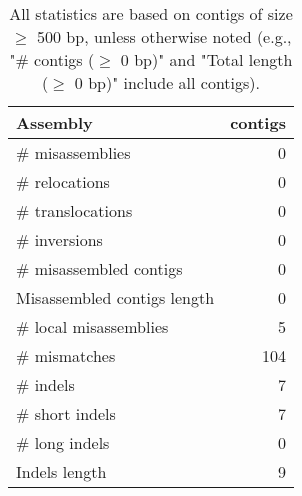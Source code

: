 \documentclass[12pt,a4paper]{article}
\begin{document}
\begin{table}[ht]
\begin{center}
\caption{All statistics are based on contigs of size $\geq$ 500 bp, unless otherwise noted (e.g., "\# contigs ($\geq$ 0 bp)" and "Total length ($\geq$ 0 bp)" include all contigs).}
\begin{tabular}{|l*{1}{|r}|}
\hline
Assembly & contigs \\ \hline
\# misassemblies & 0 \\ \hline
\hspace{5mm}\# relocations & 0 \\ \hline
\hspace{5mm}\# translocations & 0 \\ \hline
\hspace{5mm}\# inversions & 0 \\ \hline
\# misassembled contigs & 0 \\ \hline
Misassembled contigs length & 0 \\ \hline
\# local misassemblies & 5 \\ \hline
\# mismatches & 104 \\ \hline
\# indels & 7 \\ \hline
\hspace{5mm}\# short indels & 7 \\ \hline
\hspace{5mm}\# long indels & 0 \\ \hline
Indels length & 9 \\ \hline
\end{tabular}
\end{center}
\end{table}
\end{document}
